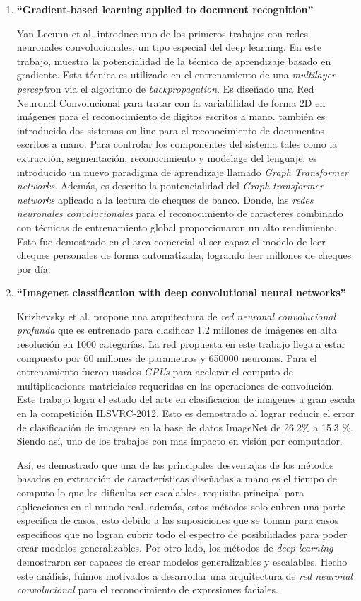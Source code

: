\begin{enumerate}

\item{\textbf{“Gradient-based learning applied to document recognition” \cite{2lecun1998gradient}}

 Yan Lecunn  et al. introduce uno de los primeros trabajos con redes neuronales convolucionales, un tipo especial del deep learning. En este trabajo, muestra la potencialidad de la técnica de aprendizaje basado en gradiente. Esta técnica es utilizado en el entrenamiento de una \textit{multilayer perceptr}on via el algoritmo de \textit{backpropagation}. Es diseñado una Red Neuronal Convolucional para tratar con la variabilidad de forma 2D en imágenes para el reconocimiento de digitos escritos a mano. también es introducido dos sistemas on-line para el reconocimiento de documentos escritos a mano. Para controlar los componentes del sistema tales como la extracción, segmentación, reconocimiento y modelage del lenguaje; es introducido un nuevo paradigma de aprendizaje llamado \textit{Graph Transformer networks}. Además, es descrito la pontencialidad del \textit{Graph transformer networks} aplicado a la lectura de cheques de banco. Donde, las \textit{redes neuronales convolucionales} para el reconocimiento de caracteres combinado con técnicas de entrenamiento global proporcionaron un alto rendimiento. Esto fue demostrado en el area comercial al ser capaz el modelo de leer cheques personales de forma automatizada, logrando leer millones de cheques por día. 
}
\item{\textbf{“Imagenet classification with deep convolutional neural networks” \cite{8krizhevsky2012imagenet}}
 
Krizhevsky et al. propone una arquitectura de \textit{red neuronal convolucional profunda} que es entrenado para clasificar 1.2 millones de imágenes en alta resolución en 1000 categorías. La red propuesta en este trabajo llega a estar compuesto por 60 millones de parametros y 650000 neuronas. Para el entrenamiento fueron usados \textit{GPUs} para acelerar el computo de multiplicaciones matriciales requeridas en las operaciones de convolución. Este trabajo logra el estado del arte en clasificacion de imagenes a gran escala en la competición ILSVRC-2012. Esto es demostrado al lograr reducir el error de clasificación de imagenes en la base de datos ImageNet de 26.2\% a 15.3 \%. Siendo así, uno de los trabajos con mas impacto en visión por computador. 

Así, es demostrado que una de las principales desventajas de los métodos basados en extracción de características diseñadas a mano es el tiempo de computo lo que les dificulta ser escalables, requisito principal para aplicaciones en el mundo real. además, estos métodos solo cubren una parte específica de casos, esto debido a las suposiciones que se toman para casos específicos que no logran cubrir todo el espectro de posibilidades para poder crear modelos generalizables. Por otro lado, los métodos de \textit{deep learning} demostraron ser capaces de crear modelos generalizables y escalables. Hecho este análisis, fuimos motivados a desarrollar una arquitectura de \textit{red neuronal convolucional} para el reconocimiento de expresiones faciales.
}
\end{enumerate}
